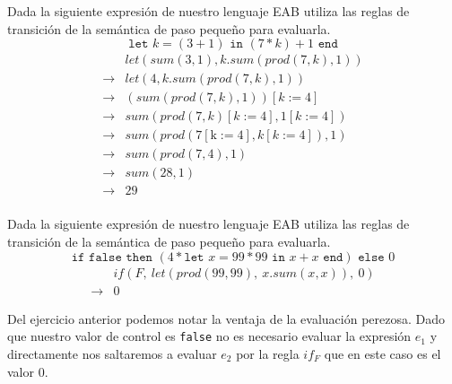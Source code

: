     \begin{exercise}
        Dada la siguiente expresión de nuestro lenguaje \textsf{EAB} utiliza las reglas de transición de la semántica de paso pequeño para evaluarla.
        \[
            \texttt{let } k = (3 + 1) \texttt{ in } (7 * k) + 1 \texttt{ end} 
        \]
        \[
            \begin{array}{cl}
                &\textit{let}(\textit{sum}(3,1), \textit{k}.\textit{sum}(\textit{prod}(7,\textit{k}), 1))\\
                \rightarrow &\textit{let}(4, \textit{k}.\textit{sum}(\textit{prod}(7, \textit{k}), 1))\\
                \rightarrow &(\textit{sum}(\textit{prod}(7, \textit{k}),1))[\textit{k}:=4]\\
                \rightarrow &\textit{sum}(\textit{prod}(7, \textit{k})[\textit{k}:=4],1[\textit{k}:=4])\\
                \rightarrow &\textit{sum}(\textit{prod}(7[\text{k}:=4], \textit{k}[\textit{k}:=4]),1)\\
                \rightarrow &\textit{sum}(\textit{prod}(7, 4), 1)\\
                \rightarrow &\textit{sum}(28, 1)\\
                \rightarrow &29\\
                

            \end{array}
        \]
        
    \end{exercise}


    \begin{exercise}
        Dada la siguiente expresión de nuestro lenguaje \textsf{EAB} utiliza las reglas de transición de la semántica de paso pequeño para evaluarla.
        \[
            \texttt{if }\texttt{false} \texttt{ then } (4 * \texttt{let } x = 99 * 99 \texttt{ in } x + x \texttt{ end}) \texttt{ else } 0 
        \] 
        \[
            \begin{array}{cl}
                &if(F,\ let(prod(99,99),\ x.sum(x,x)),\ 0)\\
                \rightarrow &0

            \end{array}
        \]
    \end{exercise}

    Del ejercicio anterior podemos notar la ventaja de la evaluación perezosa. Dado que nuestro valor de control es \texttt{false} no es necesario evaluar la expresión $e_1$ y directamente nos saltaremos a evaluar $e_2$ por la regla $if_F$ que en este caso es el valor 0.\\
    

